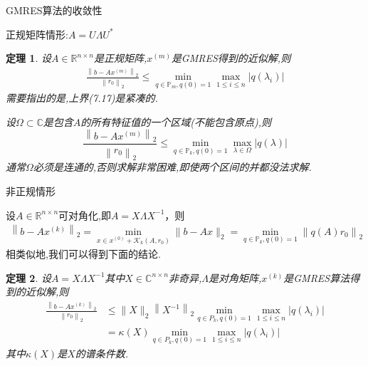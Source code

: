 \documentclass[notheorems,serif]{beamer}
\renewcommand{\normalsize}{\wuhao}
\newcommand{\wuhao}{\fontsize{10.5pt}{\baselineskip}\selectfont}
\newcommand{\hei}[1]{{\HEI#1}}
\newtheorem{theorem}{\hei{定理}}
\begin{document}
\begin{frame}


{\color{blue}\Large GMRES算法的收敛性}

\quad

\normalsize
正规矩阵情形:{\color{blue}$A=U \Lambda U^{*}$}
\begin{theorem}
设$A \in \mathbb{R}^{n \times n}$是正规矩阵,$x^{(m)}$是GMRES得到的近似解,则
\begin{align*}
	\frac{\left\|b-A x^{(m)}\right\|_{2}}{\left\|r_{0}\right\|_{2}} \leq \min _{q \in \mathbb{P}_{m}, q(0)=1} \max _{1 \leq i \leq n}\left|q\left(\lambda_{i}\right)\right|
	\tag{7.17}
\end{align*}
需要指出的是,上界(7.17)是紧凑的.

设$\Omega \subset \mathbb{C}$是包含$A$的所有特征值的一个区域(不能包含原点),则
$$
\frac{\left\|b-A x^{(m)}\right\|_{2}}{\left\|r_{0}\right\|_{2}} \leq \min _{q \in \mathbb{P}_{k}, q(0)=1} \max _{\lambda \in \Omega}|q(\lambda)|
$$
通常$\Omega$必须是连通的,否则求解非常困难,即使两个区间的并都没法求解.
\end{theorem}
\end{frame}

\begin{frame}


{\color{blue}\Large 非正规情形}

\quad

\normalsize
{\color{blue}设$A \in \mathbb{R}^{n \times n}$可对角化},即$A=X \Lambda X^{-1}$，则
\begin{align*}
	\left\|b-A x^{(k)}\right\|_{2}=\min _{x \in x^{(0)}+\mathcal{K}_{k}\left(A, r_{0}\right)}\|b-A x\|_{2}=\min _{q \in \mathbb{P}_{k}, q(0)=1}\left\|q(A) r_{0}\right\|_{2}
	\tag{7.18}
\end{align*}
相类似地,我们可以得到下面的结论.
\begin{theorem}
设$A=X \Lambda X^{-1}$其中$X \in \mathbb{C}^{n \times n}$非奇异,$\Lambda$是对角矩阵,$x^{(k)}$是GMRES算法得到的近似解,则
\begin{align*}
	\frac{\left\|b-A x^{(k)}\right\|_{2}}{\left\|r_{0}\right\|_{2}} & \leq\|X\|_{2}\left\|X^{-1}\right\|_{2} \min _{q \in P_{k}, q(0)=1} \max _{1 \leq i \leq n}\left|q\left(\lambda_{i}\right)\right| \\ &=\kappa(X) \min _{q \in P_{k}, q(0)=1} \max _{1 \leq i \leq n}\left|q\left(\lambda_{i}\right)\right|
	\tag{7.19}
\end{align*}
其中$\kappa(X)$是$X$的谱条件数.
\end{theorem}
\end{frame}
\end{document}
